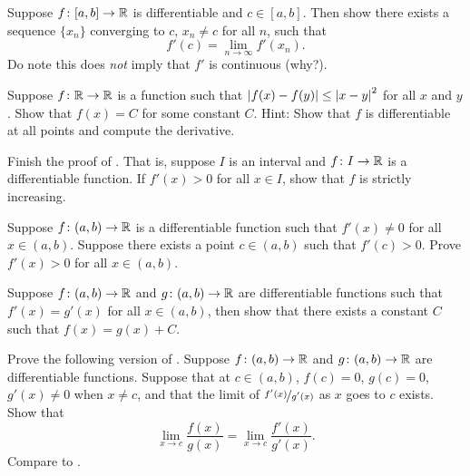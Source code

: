 \begin{exercise}
Suppose $f \colon [a,b] \to {\mathbb{R}}$ is differentiable and $c \in [a,b]$.
Then show there exists a sequence $\{ x_n \}$ converging to $c$, $x_n
\not= c$ for all $n$, such that
\begin{equation*}
f'(c) = \lim_{n\to \infty} f'(x_n).
\end{equation*}
Do note this does \emph{not} imply that $f'$ is continuous (why?).
\end{exercise}

\begin{exercise}
Suppose $f \colon {\mathbb{R}} \to {\mathbb{R}}$ is a function such that
$\left\lvert {f(x)-f(y)} \right\rvert \leq \left\lvert {x-y} \right\rvert^2$ for all $x$ and $y$.  Show that
$f(x) = C$ for some constant $C$.  Hint: Show that $f$ is differentiable
at all points and compute the derivative.
\end{exercise}

\begin{exercise} \label{exercise:posderincr}
Finish the proof of .  That is,
suppose $I$ is an interval and
$f \colon I \to {\mathbb{R}}$ is a differentiable function.
If $f'(x) > 0$ for all $x \in I$, show that $f$ is strictly increasing.
\end{exercise}

\begin{exercise}
Suppose $f \colon (a,b) \to {\mathbb{R}}$ is a differentiable function
such that
$f'(x) \not= 0$ for all $x \in (a,b)$.  Suppose there
exists
a point $c \in (a,b)$ such that $f'(c) > 0$.
Prove $f'(x) > 0$ for all $x \in (a,b)$.
\end{exercise}

\begin{exercise} \label{exercise:samediffconst}
Suppose $f \colon (a,b) \to {\mathbb{R}}$ and $g \colon (a,b) \to {\mathbb{R}}$ are
differentiable functions such that $f'(x) = g'(x)$ for all $x \in (a,b)$,
then show that there exists a constant $C$ such that $f(x) = g(x) + C$.
\end{exercise}

\begin{exercise}
Prove the following version of .  Suppose 
$f \colon (a,b) \to {\mathbb{R}}$ and $g \colon (a,b) \to {\mathbb{R}}$ are differentiable
functions.  Suppose that at $c \in (a,b)$, $f(c) = 0$, $g(c)=0$,
$g'(x) \not= 0$ when $x \not= c$, and
that the limit of $\nicefrac{f'(x)}{g'(x)}$ as $x$ goes to $c$ exists.  Show that
\begin{equation*}
\lim_{x \to c} \frac{f(x)}{g(x)} = 
\lim_{x \to c} \frac{f'(x)}{g'(x)} .
\end{equation*}
Compare to .
\end{exercise}

